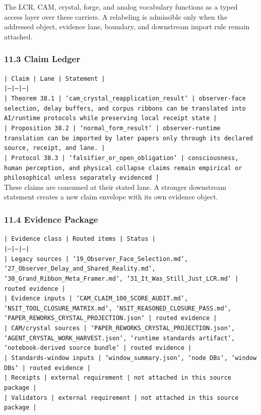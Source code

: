 \documentclass[11pt]{article}
\begin{document}
The LCR, CAM, crystal, forge, and analog vocabulary functions as a typed access
layer over these carriers. A relabeling is admissible only when the addressed
object, evidence lane, boundary, and downstream import rule remain attached.

\subsubsection*{11.3 Claim Ledger}

\noindent\texttt{| Claim | Lane | Statement |}\\
\noindent\texttt{|---|---|---|}\\
\noindent\texttt{| Theorem 38.1 | `cam\_crystal\_reapplication\_result` | observer-face selection, delay buffers, and corpus ribbons can be translated into AI/runtime protocols while preserving local receipt state |}\\
\noindent\texttt{| Proposition 38.2 | `normal\_form\_result` | observer-runtime translation can be imported by later papers only through its declared source, receipt, and lane. |}\\
\noindent\texttt{| Protocol 38.3 | `falsifier\_or\_open\_obligation` | consciousness, human perception, and physical collapse claims remain empirical or philosophical unless separately evidenced |}\\

These claims are consumed at their stated lane. A stronger downstream statement
creates a new claim envelope with its own evidence object.

\subsubsection*{11.4 Evidence Package}

\noindent\texttt{| Evidence class | Routed items | Status |}\\
\noindent\texttt{|---|---|---|}\\
\noindent\texttt{| Legacy sources | `19\_Observer\_Face\_Selection.md`, `27\_Observer\_Delay\_and\_Shared\_Reality.md`, `30\_Grand\_Ribbon\_Meta\_Framer.md`, `31\_It\_Was\_Still\_Just\_LCR.md` | routed evidence |}\\
\noindent\texttt{| Evidence inputs | `CAM\_CLAIM\_100\_SCORE\_AUDIT.md`, `NSIT\_TOOL\_CLOSURE\_MATRIX.md`, `NSIT\_REASONED\_CLOSURE\_PASS.md`, `PAPER\_REWORKS\_CRYSTAL\_PROJECTION.json` | routed evidence |}\\
\noindent\texttt{| CAM/crystal sources | `PAPER\_REWORKS\_CRYSTAL\_PROJECTION.json`, `AGENT\_CRYSTAL\_WORK\_HARVEST.json`, `runtime standards artifact`, `notebook-derived source bundle` | routed evidence |}\\
\noindent\texttt{| Standards-window inputs | `window\_summary.json`, `node DBs`, `window DBs` | routed evidence |}\\
\noindent\texttt{| Receipts | external requirement | not attached in this source package |}\\
\noindent\texttt{| Validators | external requirement | not attached in this source package |}\\
\end{document}
